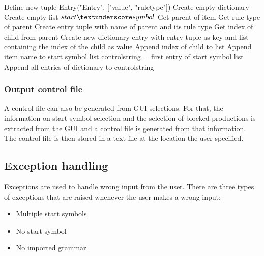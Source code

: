 \begin{algorithm}[H]
\caption{GUI Algorithm: produce\textunderscore controlfile}
\label{alg:produceControlfile}
\begin{algorithmic}[1] 
\State Define new tuple Entry("Entry", ["value", "rule\textunderscore type"])
\State Create empty dictionary
\State Create empty list $start\textunderscore symbol$
	\State Get parent of item
		\State Get rule type of parent
		\State Create entry tuple with name of parent and its rule type
		\State Get index of child from parent
			\State Create new dictionary entry with entry tuple as key and list containing the index of the child as value
		\Else
			\State Append index of child to list
		\EndIf
		\State Append item name to start symbol list
	\EndIf
\EndFor
\State control\textunderscore string = first entry of start symbol list
\State Append all entries of dictionary to control\textunderscore string
\end{algorithmic}
\end{algorithm} 

\subsubsection{Output control file}\label{sec:ImplementationGUIOutput control file}
A control file can also be generated from GUI selections.
For that, the information on start symbol selection and the selection of blocked productions is extracted from the GUI and a control file is generated from that information. The control file is then stored in a text file at the location the user specified.

\subsection{Exception handling}\label{sec:ImplementationGUIExceptionHandling}

Exceptions are used to handle wrong input from the user. There are three types of exceptions that are raised whenever the user makes a wrong input: 

\begin{itemize}
\item Multiple start symbols
\item No start symbol
\item No imported grammar
\end{itemize}

